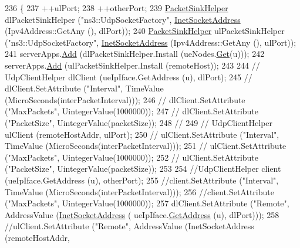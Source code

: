 \begin{DoxyCode}
236         \{
237                 ++ulPort;
238                 ++otherPort;
239                 \hyperlink{classns3_1_1PacketSinkHelper}{PacketSinkHelper} dlPacketSinkHelper (\textcolor{stringliteral}{"ns3::UdpSocketFactory"}, 
      \hyperlink{classns3_1_1InetSocketAddress}{InetSocketAddress} (Ipv4Address::GetAny (), dlPort));
240                 \hyperlink{classns3_1_1PacketSinkHelper}{PacketSinkHelper} ulPacketSinkHelper (\textcolor{stringliteral}{"ns3::UdpSocketFactory"}, 
      \hyperlink{classns3_1_1InetSocketAddress}{InetSocketAddress} (Ipv4Address::GetAny (), ulPort));
241                 serverApps.\hyperlink{classns3_1_1ApplicationContainer_ad09ab1a1ad5849d518d5f4c262e38152}{Add} (dlPacketSinkHelper.Install (ueNodes.\hyperlink{classns3_1_1NodeContainer_a9ed96e2ecc22e0f5a3d4842eb9bf90bf}{Get}(u)));
242                 serverApps.\hyperlink{classns3_1_1ApplicationContainer_ad09ab1a1ad5849d518d5f4c262e38152}{Add} (ulPacketSinkHelper.Install (remoteHost));
243 
244 \textcolor{comment}{//              UdpClientHelper dlClient (ueIpIface.GetAddress (u), dlPort);}
245 \textcolor{comment}{//              dlClient.SetAttribute ("Interval", TimeValue (MicroSeconds(interPacketInterval)));}
246 \textcolor{comment}{//              dlClient.SetAttribute ("MaxPackets", UintegerValue(1000000));}
247 \textcolor{comment}{//              dlClient.SetAttribute ("PacketSize", UintegerValue(packetSize));}
248 \textcolor{comment}{//}
249 \textcolor{comment}{//              UdpClientHelper ulClient (remoteHostAddr, ulPort);}
250 \textcolor{comment}{//              ulClient.SetAttribute ("Interval", TimeValue (MicroSeconds(interPacketInterval)));}
251 \textcolor{comment}{//              ulClient.SetAttribute ("MaxPackets", UintegerValue(1000000));}
252 \textcolor{comment}{//              ulClient.SetAttribute ("PacketSize", UintegerValue(packetSize));}
253 
254                 \textcolor{comment}{//UdpClientHelper client (ueIpIface.GetAddress (u), otherPort);}
255                 \textcolor{comment}{//client.SetAttribute ("Interval", TimeValue (MicroSeconds(interPacketInterval)));}
256                 \textcolor{comment}{//client.SetAttribute ("MaxPackets", UintegerValue(1000000));}
257                 dlClient.SetAttribute (\textcolor{stringliteral}{"Remote"}, AddressValue (\hyperlink{classns3_1_1InetSocketAddress}{InetSocketAddress} (
      ueIpIface.\hyperlink{classns3_1_1Ipv4InterfaceContainer_ae63208dcd222be986822937ee4aa828c}{GetAddress} (u), dlPort)));
258                 \textcolor{comment}{//ulClient.SetAttribute ("Remote", AddressValue (InetSocketAddress (remoteHostAddr,
}
\end{DoxyCode}
